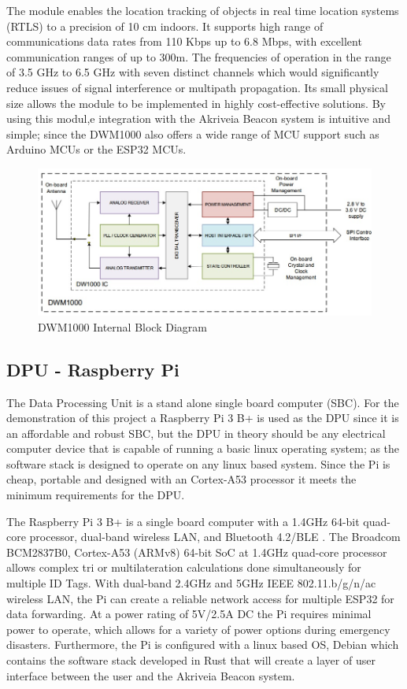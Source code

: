 The module enables the location tracking of objects in real time location systems (RTLS) to a precision of 10 cm indoors. It supports high range of communications data rates from 110 Kbps up to 6.8 Mbps, with excellent communication ranges of up to 300m. The frequencies of operation in the range of 3.5 GHz to 6.5 GHz with seven distinct channels which would significantly reduce issues of signal interference or multipath propagation. Its small physical size allows the module to be implemented in highly cost-effective solutions. By using this modul,e integration with the Akriveia Beacon system is intuitive and simple; since the DWM1000 also offers a wide range of MCU support such as Arduino MCUs or the ESP32 MCUs. 

\medskip
\begin{figure}[H]
\centering
    \includegraphics[scale=0.7]{./images/dwm1000_bd.jpg}
    \caption{DWM1000 Internal Block Diagram}
    \label{dwm1000_bd}
\end{figure}



\pagebreak
\subsection{DPU - Raspberry Pi}
\medskip
The Data Processing Unit is a stand alone single board computer (SBC). For the demonstration of this project a Raspberry Pi 3 B+ is used as the DPU since it is an affordable and robust SBC, but the DPU in theory should be any electrical computer device that is capable of running a basic linux operating system; as the software stack is designed to operate on any linux based system. Since the Pi is cheap, portable and designed with an Cortex-A53 processor it meets the minimum requirements for the DPU.

\bigskip
The Raspberry Pi 3 B+ is a single board computer with a 1.4GHz 64-bit quad-core processor, dual-band wireless LAN, and Bluetooth 4.2/BLE \cite{R3-3-1}. The Broadcom BCM2837B0, Cortex-A53 (ARMv8) 64-bit SoC at 1.4GHz quad-core processor allows complex tri or multilateration calculations done simultaneously for multiple ID Tags. With dual-band 2.4GHz and 5GHz IEEE 802.11.b/g/n/ac wireless LAN, the Pi can create a reliable network access for multiple ESP32 for data forwarding. At a power rating of 5V/2.5A DC the Pi requires minimal power to operate, which allows for a variety of power options during emergency disasters. Furthermore, the Pi is configured with a linux based OS, Debian which contains the software stack developed in Rust that will create a layer of user interface between the user and the Akriveia Beacon system.


